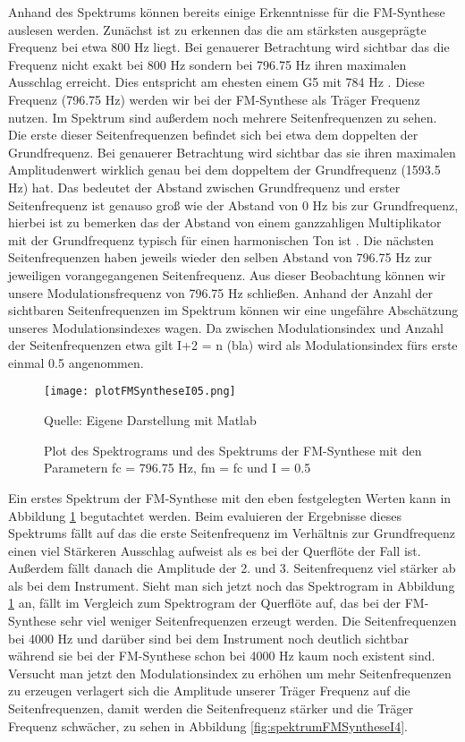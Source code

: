 Anhand des Spektrums können bereits einige Erkenntnisse für die FM-Synthese auslesen werden. Zunächst ist zu erkennen das die am stärksten ausgeprägte Frequenz bei etwa 800 Hz liegt. Bei genauerer Betrachtung wird sichtbar das die Frequenz nicht exakt bei 800 Hz sondern bei 796.75 Hz ihren maximalen Ausschlag erreicht. Dies entspricht am ehesten einem G5 mit 784 Hz \cite[S. 181]{borucki}. Diese Frequenz (796.75 Hz) werden wir bei der FM-Synthese als Träger Frequenz nutzen. Im Spektrum sind außerdem noch mehrere Seitenfrequenzen zu sehen. Die erste dieser Seitenfrequenzen befindet sich bei etwa dem doppelten der Grundfrequenz. Bei genauerer Betrachtung wird sichtbar das sie ihren maximalen Amplitudenwert wirklich genau bei dem doppeltem der Grundfrequenz (1593.5 Hz) hat. Das bedeutet der Abstand zwischen Grundfrequenz und erster Seitenfrequenz ist genauso groß wie der Abstand von 0 Hz bis zur Grundfrequenz, hierbei ist zu bemerken das der Abstand von einem ganzzahligen Multiplikator mit der Grundfrequenz typisch für einen harmonischen Ton ist \cite[S. 528]{chowningPaper}. Die nächsten Seitenfrequenzen haben jeweils wieder den selben Abstand von 796.75 Hz zur jeweiligen vorangegangenen Seitenfrequenz. Aus dieser Beobachtung können wir unsere Modulationsfrequenz von 796.75 Hz schließen. Anhand der Anzahl der sichtbaren Seitenfrequenzen im Spektrum können wir eine ungefähre Abschätzung unseres Modulationsindexes wagen. Da zwischen Modulationsindex und Anzahl der Seitenfrequenzen etwa gilt I+2 = n (bla) wird als Modulationsindex fürs erste einmal 0.5 angenommen. 

\begin{figure} [ht]
\centering
  \texttt{[image: plotFMSyntheseI05.png]}
\caption{Plot des Spektrograms und des Spektrums der FM-Synthese mit den Parametern fc = 796.75 Hz, fm = fc und I = 0.5 }
\label{fig:plotFMSyntheseI05}
Quelle: Eigene Darstellung mit Matlab
\end{figure}

Ein erstes Spektrum der FM-Synthese mit den eben festgelegten Werten kann in Abbildung \ref{fig:plotFMSyntheseI05} begutachtet werden. Beim evaluieren der Ergebnisse dieses Spektrums fällt auf das die erste Seitenfrequenz im Verhältnis zur Grundfrequenz einen viel Stärkeren Ausschlag aufweist als es bei der Querflöte der Fall ist. Außerdem fällt danach die Amplitude der 2. und 3. Seitenfrequenz viel stärker ab als bei dem Instrument. Sieht man sich jetzt noch das Spektrogram in Abbildung \ref{fig:plotFMSyntheseI05} an, fällt im Vergleich zum Spektrogram der Querflöte auf, das bei der FM-Synthese sehr viel weniger Seitenfrequenzen erzeugt werden. Die Seitenfrequenzen bei 4000 Hz und darüber sind bei dem Instrument noch deutlich sichtbar während sie bei der FM-Synthese schon bei 4000 Hz kaum noch existent sind. Versucht man jetzt den Modulationsindex zu erhöhen um mehr Seitenfrequenzen zu erzeugen verlagert sich die Amplitude unserer Träger Frequenz auf die Seitenfrequenzen, damit werden die Seitenfrequenz stärker und die Träger Frequenz schwächer, zu sehen in Abbildung \ref{fig:spektrumFMSyntheseI4}.


